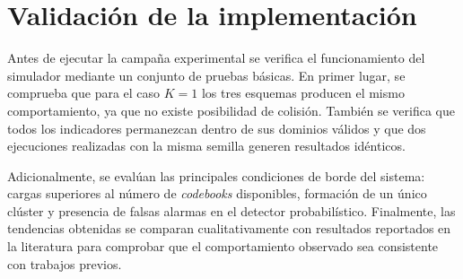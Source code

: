 \section{Validación de la implementación}
\label{sec:impl_validacion}

Antes de ejecutar la campaña experimental se verifica el funcionamiento del simulador mediante un conjunto de pruebas básicas. En primer lugar, se comprueba que para el caso $K=1$ los tres esquemas producen el mismo comportamiento, ya que no existe posibilidad de colisión. También se verifica que todos los indicadores permanezcan dentro de sus dominios válidos y que dos ejecuciones realizadas con la misma semilla generen resultados idénticos.

Adicionalmente, se evalúan las principales condiciones de borde del sistema: cargas superiores al número de \emph{codebooks} disponibles, formación de un único clúster y presencia de falsas alarmas en el detector probabilístico. Finalmente, las tendencias obtenidas se comparan cualitativamente con resultados reportados en la literatura para comprobar que el comportamiento observado sea consistente con trabajos previos.